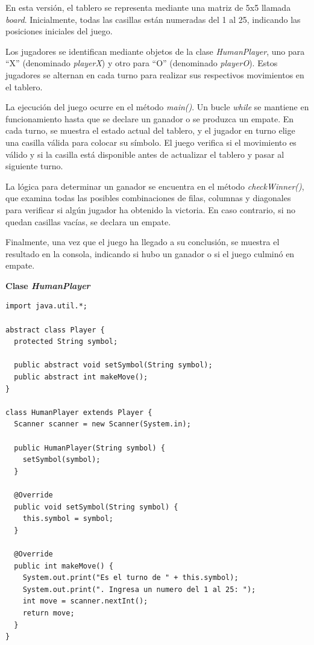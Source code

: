 \documentclass[11pt, twocolumn]{article}
\begin{document}
  En esta versión, el tablero se representa mediante una matriz de 5x5 llamada \textit{board}. Inicialmente, todas las casillas están numeradas del 1 al 25, indicando las posiciones iniciales del juego.

  Los jugadores se identifican mediante objetos de la clase \textit{HumanPlayer}, uno para ``X'' (denominado \textit{playerX}) y otro para ``O'' (denominado \textit{playerO}). Estos jugadores se alternan en cada turno para realizar sus respectivos movimientos en el tablero.

  La ejecución del juego ocurre en el método \textit{main()}. Un bucle \textit{while} se mantiene en funcionamiento hasta que se declare un ganador o se produzca un empate. En cada turno, se muestra el estado actual del tablero, y el jugador en turno elige una casilla válida para colocar su símbolo. El juego verifica si el movimiento es válido y si la casilla está disponible antes de actualizar el tablero y pasar al siguiente turno.

  La lógica para determinar un ganador se encuentra en el método \textit{checkWinner()}, que examina todas las posibles combinaciones de filas, columnas y diagonales para verificar si algún jugador ha obtenido la victoria. En caso contrario, si no quedan casillas vacías, se declara un empate.
  
  Finalmente, una vez que el juego ha llegado a su conclusión, se muestra el resultado en la consola, indicando si hubo un ganador o si el juego culminó en empate.

  \textbf{Clase \textit{HumanPlayer}}
  \begin{lstlisting}
import java.util.*;

abstract class Player {
  protected String symbol;

  public abstract void setSymbol(String symbol);
  public abstract int makeMove();
}

class HumanPlayer extends Player {
  Scanner scanner = new Scanner(System.in);

  public HumanPlayer(String symbol) {
    setSymbol(symbol);
  }

  @Override
  public void setSymbol(String symbol) {
    this.symbol = symbol;
  }

  @Override
  public int makeMove() {
    System.out.print("Es el turno de " + this.symbol);
    System.out.print(". Ingresa un numero del 1 al 25: ");
    int move = scanner.nextInt();
    return move;
  }
}
  \end{lstlisting}
\end{document}
